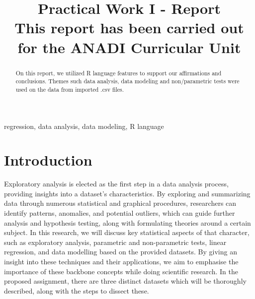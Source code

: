 \documentclass[conference]{IEEEtran}
\begin{document}
\title{Practical Work I - Report\\
{\footnotesize \textsuperscript{}This report has been carried out for the ANADI Curricular Unit}
}

\author{
\and

\and

}

\maketitle

\begin{abstract}
On this report, we utilized R language features to support our affirmations and conclusions.
Themes such data analysis, data modeling and non/parametric tests were used on the data
from imported .csv files. 
\end{abstract}

\begin{IEEEkeywords}
regression, data analysis, data modeling, R language
\end{IEEEkeywords}

\section{Introduction}

Exploratory analysis is elected as the first step in a data analysis process, providing insights into a dataset's characteristics. By exploring and summarizing data through numerous statistical and graphical procedures, researchers can identify patterns, anomalies, and potential outliers, which can guide further analysis and hypothesis testing, along with formulating theories around a certain subject. 
In this research, we will discuss key statistical aspects of that character, such as exploratory analysis, parametric and non-parametric tests, linear regression, and data modelling based on the provided datasets. 
By giving an insight into these techniques and their applications, we aim to emphasise the importance of these backbone concepts while doing scientific research.
In the proposed assignment, there are three distinct datasets which will be thoroughly described, along with the steps to dissect these.
\end{document}
